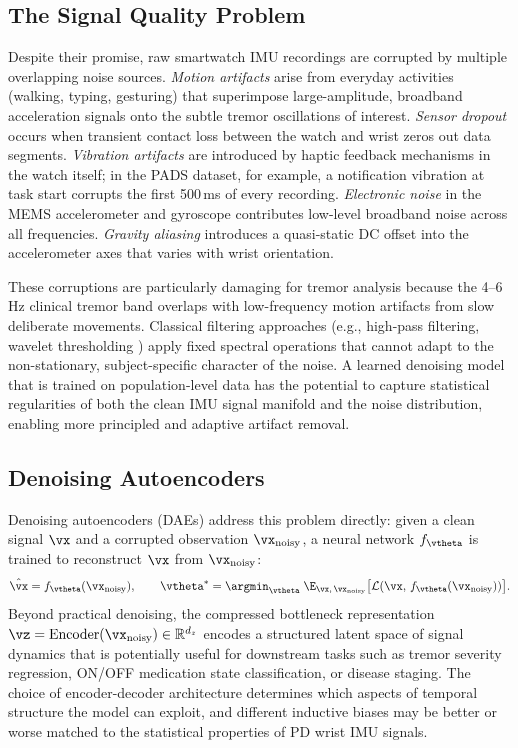\documentclass{article}
\begin{document}
\subsection{The Signal Quality Problem}

Despite their promise, raw smartwatch IMU recordings are corrupted by multiple
overlapping noise sources.
\emph{Motion artifacts} arise from everyday activities (walking, typing,
gesturing) that superimpose large-amplitude, broadband acceleration signals onto
the subtle tremor oscillations of interest.
\emph{Sensor dropout} occurs when transient contact loss between the watch and
wrist zeros out data segments.
\emph{Vibration artifacts} are introduced by haptic feedback mechanisms in the
watch itself; in the PADS dataset, for example, a notification vibration at task
start corrupts the first 500\,ms of every recording.
\emph{Electronic noise} in the MEMS accelerometer and gyroscope contributes
low-level broadband noise across all frequencies.
\emph{Gravity aliasing} introduces a quasi-static DC offset into the
accelerometer axes that varies with wrist orientation.

These corruptions are particularly damaging for tremor analysis because the
4--6\,Hz clinical tremor band overlaps with low-frequency motion artifacts from
slow deliberate movements.
Classical filtering approaches (e.g., high-pass filtering, wavelet thresholding
\citep{donoho1995wavelet}) apply fixed spectral operations that cannot adapt to
the non-stationary, subject-specific character of the noise.
A learned denoising model that is trained on population-level data has the
potential to capture statistical regularities of both the clean IMU signal
manifold and the noise distribution, enabling more principled and adaptive
artifact removal.

\subsection{Denoising Autoencoders}

Denoising autoencoders (DAEs) \citep{vincent2008extracting,vincent2010stacked}
address this problem directly: given a clean signal $\vx$ and a corrupted
observation $\vx_{\text{noisy}}$, a neural network $f_{\vtheta}$ is trained to
reconstruct $\vx$ from $\vx_{\text{noisy}}$:
%
\begin{equation}
  \hat{\vx} = f_{\vtheta}(\vx_{\text{noisy}}),
  \qquad
  \vtheta^* = \argmin_{\vtheta}\;
  \E_{\vx,\,\vx_{\text{noisy}}}\bigl[\mathcal{L}(\vx,\,f_{\vtheta}(\vx_{\text{noisy}}))\bigr].
  \label{eq:dae}
\end{equation}
%
Beyond practical denoising, the compressed bottleneck representation
$\vz = \text{Encoder}(\vx_{\text{noisy}}) \in \mathbb{R}^{d_z}$ encodes a
structured latent space of signal dynamics that is potentially useful for
downstream tasks such as tremor severity regression, ON/OFF medication state
classification, or disease staging.
The choice of encoder-decoder architecture determines which aspects of temporal
structure the model can exploit, and different inductive biases may be
better or worse matched to the statistical properties of PD wrist IMU signals.
\end{document}
